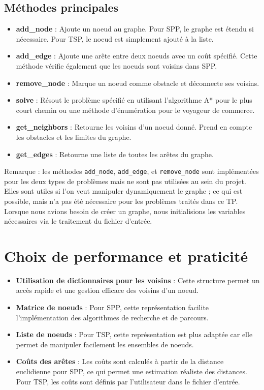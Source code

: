 \subsection{Méthodes principales}
\begin{itemize}
    \item \textbf{add\_node} : Ajoute un noeud au graphe. Pour \ac{SPP}, le graphe est étendu si nécessaire. Pour \ac{TSP}, le noeud est simplement ajouté à la liste.
    \item \textbf{add\_edge} : Ajoute une arête entre deux noeuds avec un coût spécifié. Cette méthode vérifie également que les noeuds sont voisins dans \ac{SPP}.
    \item \textbf{remove\_node} : Marque un noeud comme obstacle et déconnecte ses voisins.
    \item \textbf{solve} : Résout le problème spécifié en utilisant l'algorithme A* pour le plus court chemin ou une méthode d'énumération pour le voyageur de commerce.
    \item \textbf{get\_neighbors} : Retourne les voisins d'un noeud donné. Prend en compte les obstacles et les limites du graphe.
    \item \textbf{get\_edges} : Retourne une liste de toutes les arêtes du graphe.
\end{itemize}

Remarque : les méthodes \texttt{add\_node}, \texttt{add\_edge}, et \texttt{remove\_node} sont implémentées pour les deux types de problèmes mais ne sont pas utilisées au sein du projet. Elles sont utiles si l'on veut manipuler dynamiquement le graphe ; ce qui est possible, mais n'a pas été nécessaire pour les problèmes traités dans ce TP. Lorsque nous avions besoin de créer un graphe, nous initialisions les variables nécessaires via le traitement du fichier d'entrée.

\section{Choix de performance et praticité}
\begin{itemize}
    \item \textbf{Utilisation de dictionnaires pour les voisins} : Cette structure permet un accès rapide et une gestion efficace des voisins d'un noeud.
    \item \textbf{Matrice de noeuds} : Pour \ac{SPP}, cette représentation facilite l'implémentation des algorithmes de recherche et de parcours.
    \item \textbf{Liste de noeuds} : Pour \ac{TSP}, cette représentation est plus adaptée car elle permet de manipuler facilement les ensembles de noeuds.
    \item \textbf{Coûts des arêtes} : Les coûts sont calculés à partir de la distance euclidienne pour \ac{SPP}, ce qui permet une estimation réaliste des distances. Pour \ac{TSP}, les coûts sont définis par l'utilisateur dans le fichier d'entrée.
\end{itemize}


